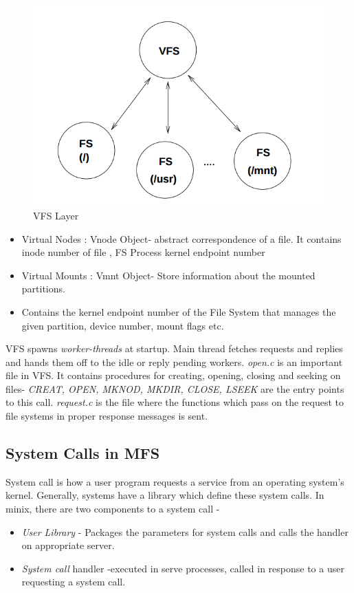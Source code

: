 \begin{figure}[!htb]
    \centering
    \includegraphics[scale=0.5]{img/vfslayer.png}
    \caption{VFS Layer}
\end{figure}
\begin{itemize}
\item Virtual Nodes : Vnode Object- abstract correspondence of a file. It contains
inode number of file , FS Process kernel endpoint number
\item Virtual Mounts : Vmnt Object- Store information about the mounted partitions.
\item Contains the kernel endpoint number of the File System that manages the given partition, device number, mount flags etc.
\end{itemize}

VFS spawns \emph{worker-threads} at startup. Main thread fetches requests and replies and hands them off to the idle or reply pending workers. \emph{open.c} is an important file in VFS. It contains procedures for creating,
opening, closing and seeking on files-\emph{ CREAT, OPEN, MKNOD, MKDIR, CLOSE, LSEEK} are the entry points to this call. \newline
\emph{request.c} is the file where the functions which pass on the request to file systems in proper response messages is sent.



\subsection {System Calls in MFS}
System call is how a user program requests a service from an operating system's
kernel.  Generally, systems have a library which define these system calls.
In minix, there are two components to a system call - 
\begin{itemize}
\item \emph{User Library} - Packages the parameters for system calls and calls the handler on
appropriate server.
\item \emph{System call} handler -executed in serve processes,  called in response to a user
requesting a system call.
\end{itemize}

